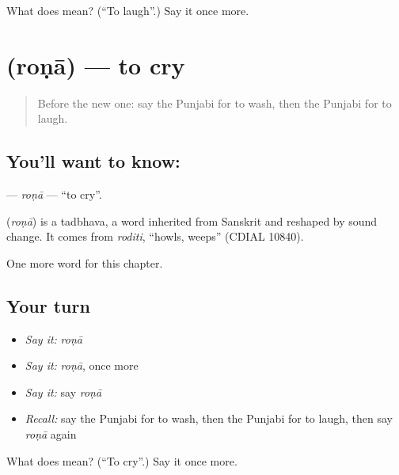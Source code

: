 \begin{tcolorbox}[breakable,colback=teal!4,colframe=teal!35!black,title={Before you move on}]
What does  mean? (\textquotedblleft{}To laugh\textquotedblright{}.) Say it once more.
\end{tcolorbox}
\section[\texorpdfstring{\pa{ਰੋਣਾ} (roṇā)}{ਰੋਣਾ (roṇā)}]{ (roṇā) — to cry}

\label{lesson:PA-C59-rona}



\begin{quote}
Before the new one: say the Punjabi for to wash, then the Punjabi for to laugh.
\end{quote}

\subsection*{You'll want to know: }
\textbf{} — \emph{roṇā} — \textquotedblleft{}to cry\textquotedblright{}.

\begin{cousinweb}
\textbf{} (\emph{roṇā}) is a tadbhava, a word inherited from Sanskrit and reshaped by sound change. It comes from \emph{roditi}, \textquotedblleft{}howls, weeps\textquotedblright{} (CDIAL 10840).
\end{cousinweb}

\begin{grammarlens}[title={What you've built}]
One more word for this chapter.
\end{grammarlens}

\subsection*{Your turn}
\begin{itemize}
\raggedright
  \item \emph{Say it:} \emph{roṇā}
  \item \emph{Say it:} \emph{roṇā}, once more
  \item \emph{Say it:} say \emph{roṇā}
  \item \emph{Recall:} say the Punjabi for to wash, then the Punjabi for to laugh, then say \emph{roṇā} again
\end{itemize}

\begin{tcolorbox}[breakable,colback=teal!4,colframe=teal!35!black,title={Before you move on}]
What does  mean? (\textquotedblleft{}To cry\textquotedblright{}.) Say it once more.
\end{tcolorbox}
